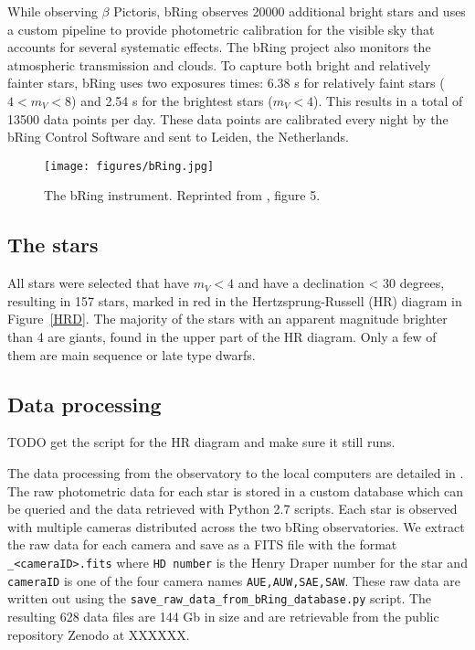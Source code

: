 \documentclass{aa}
\begin{document}
While observing $\beta$ Pictoris, bRing observes 20000 additional bright stars and uses a custom pipeline to provide photometric calibration for the visible sky that accounts for several systematic effects.
%
The bRing project also monitors the atmospheric transmission and clouds.
%
To capture both bright and relatively fainter stars, bRing uses two exposures times: 6.38 s for relatively faint stars ($4 < m_V < 8$) and 2.54 s for the brightest stars ($m_V < 4$). This results in a total of 13500 data points per day.
%
These data points are calibrated every night by the bRing Control Software and sent to Leiden, the Netherlands.

\begin{figure}
    \centering
    \texttt{[image: figures/bRing.jpg]}
    \caption{The bRing instrument. Reprinted from \cite{bRing}, figure 5.}
    \label{bRing}
\end{figure}

\subsection{The stars}

All stars were selected that have $m_V<4$ and have a declination < 30 degrees, resulting in 157 stars, marked in red in the Hertzsprung-Russell (HR) diagram in Figure~\ref{HRD}.
%
The majority of the stars with an apparent magnitude brighter than 4 are giants, found in the upper part of the HR diagram.
%
Only a few of them are main sequence or late type dwarfs.


\subsection{Data processing}

TODO get the script for the HR diagram and make sure it still runs.

The data processing from the observatory to the local computers are detailed in \citet{Stuik_2014}.
%
The raw photometric data for each star is stored in a custom database which can be queried and the data retrieved with Python 2.7 scripts.
%
Each star is observed with multiple cameras distributed across the two bRing observatories.
%
We extract the raw data for each camera and save as a FITS file with the format {\tt <HD number>\_<cameraID>.fits} where {\tt HD number} is the Henry Draper number for the star and {\tt cameraID} is one of the four camera names {\tt AUE,AUW,SAE,SAW}.
%
These raw data are written out using the {\tt save\_raw\_data\_from\_bRing\_database.py} script.
%
The resulting 628 data files are 144 Gb in size and are retrievable from the public repository Zenodo at XXXXXX.
\end{document}
